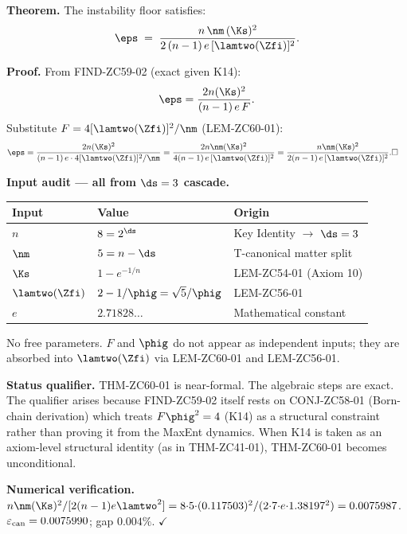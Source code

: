 \documentclass[12pt, a4paper]{article}
\begin{document}

\begin{formalbox}[title={THM-ZC60-01: Spectral Derivation of $\eps$
  --- All Inputs from $\ds=3$ Cascade ($R_0$, Near-Formal)}]
\textbf{Theorem.}
The instability floor satisfies:
\begin{equation}\label{eq:eps-spectral}
  \eps
  \;=\; \frac{n\,\nm\,(\Ks)^2}%
             {2\,(n-1)\,e\,[\lamtwo(\Zfi)]^2}.
\end{equation}

\textbf{Proof.}
From FIND-ZC59-02 (exact given K14):
\[
  \eps = \frac{2n(\Ks)^2}{(n-1)\,e\,F}.
\]
Substitute $F = 4[\lamtwo(\Zfi)]^2/\nm$ (LEM-ZC60-01):
\begin{align*}
  \eps
  &= \frac{2n(\Ks)^2}{(n-1)\,e\cdot 4[\lamtwo(\Zfi)]^2/\nm}
  = \frac{2n\nm(\Ks)^2}{4(n-1)\,e\,[\lamtwo(\Zfi)]^2}
  = \frac{n\nm(\Ks)^2}{2(n-1)\,e\,[\lamtwo(\Zfi)]^2}.
  \hfill\square
\end{align*}

\textbf{Input audit --- all from $\ds=3$ cascade.}
\begin{center}
{\small\renewcommand{\arraystretch}{1.3}
\begin{tabular}{@{}lll@{}}
\toprule
Input & Value & Origin \\
\midrule
$n$ & $8 = 2^{\ds}$ & Key Identity $\to$ $\ds=3$ \\
$\nm$ & $5 = n-\ds$ & T-canonical matter split \\
$\Ks$ & $1-e^{-1/n}$ & LEM-ZC54-01 (Axiom 10) \\
$\lamtwo(\Zfi)$ & $2-1/\phig = \sqrt{5}/\phig$ & LEM-ZC56-01 \\
$e$ & $2.71828\ldots$ & Mathematical constant \\
\bottomrule
\end{tabular}
}
\end{center}
No free parameters.  $F$ and $\phig$ do not appear as
independent inputs; they are absorbed into $\lamtwo(\Zfi)$
via LEM-ZC60-01 and LEM-ZC56-01.

\textbf{Status qualifier.}
THM-ZC60-01 is near-formal.  The algebraic steps are exact.
The qualifier arises because FIND-ZC59-02 itself rests on
CONJ-ZC58-01 (Born-chain derivation) which treats
$F\phig^2=4$ (K14) as a structural constraint rather than
proving it from the MaxEnt dynamics.  When K14 is taken as
an axiom-level structural identity (as in THM-ZC41-01),
THM-ZC60-01 becomes unconditional.

\textbf{Numerical verification.}
$n\nm(\Ks)^2/[2(n-1)e\lamtwo^2]
= 8{\cdot}5{\cdot}(0.117503)^2/(2{\cdot}7{\cdot}e{\cdot}1.38197^2)
= 0.0075987$.
$\varepsilon_{\rm can}=0.0075990$; gap $0.004\%$. $\checkmark$
\end{formalbox}
\end{document}
